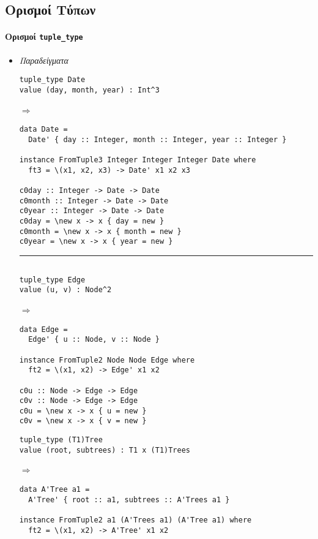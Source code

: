 \documentclass[diploma]{softlab-thesis}
\def\lra{$\Longrightarrow$\ }
\begin{document}
\newpage

\subsection{Ορισμοί Τύπων}

\paragraph{Ορισμοί \texttt{tuple_type}}

\begin{itemize}
\item
\textit{Παραδείγματα}

\begin{verbatim}
tuple_type Date
value (day, month, year) : Int^3
\end{verbatim}
\lra
\begin{verbatim}
data Date =
  Date' { day :: Integer, month :: Integer, year :: Integer }

instance FromTuple3 Integer Integer Integer Date where
  ft3 = \(x1, x2, x3) -> Date' x1 x2 x3

c0day :: Integer -> Date -> Date
c0month :: Integer -> Date -> Date
c0year :: Integer -> Date -> Date
c0day = \new x -> x { day = new }
c0month = \new x -> x { month = new }
c0year = \new x -> x { year = new }

\end{verbatim}

\rule{\linewidth}{0.1pt}

\begin{verbatim}

tuple_type Edge
value (u, v) : Node^2
\end{verbatim}
\lra
\begin{verbatim}
data Edge =
  Edge' { u :: Node, v :: Node }

instance FromTuple2 Node Node Edge where
  ft2 = \(x1, x2) -> Edge' x1 x2

c0u :: Node -> Edge -> Edge
c0v :: Node -> Edge -> Edge
c0u = \new x -> x { u = new }
c0v = \new x -> x { v = new }
\end{verbatim}

\newpage
\begin{verbatim}
tuple_type (T1)Tree
value (root, subtrees) : T1 x (T1)Trees
\end{verbatim}
\lra
\begin{verbatim}
data A'Tree a1 =
  A'Tree' { root :: a1, subtrees :: A'Trees a1 }

instance FromTuple2 a1 (A'Trees a1) (A'Tree a1) where
  ft2 = \(x1, x2) -> A'Tree' x1 x2


\end{verbatim}
\end{itemize}
\end{document}
